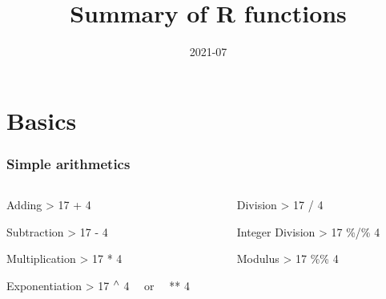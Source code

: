 \documentclass[ucs]{beamer}
\title[]{Summary of R functions}
\date[2021-07]{2021-07}
\DeclareMathOperator\caret{\raisebox{1ex}{$\scriptstyle\wedge$}}
\begin{document}
  
  \begin{frame}
    \titlepage
  \end{frame}
  
  \section{Basics}
  
  \begin{frame}
    \frametitle{Simple arithmetics}
       \begin{columns}[T]
      \begin{column}{0.5\textwidth}
          \begin{block}{Adding}
        \ttfamily > 17 + 4 
           \end{block}
     \begin{block}{Subtraction}
        \ttfamily > 17 - 4 
      \end{block}
      \begin{block}{Multiplication}
         \ttfamily > 17 * 4 
       \end{block}
           \begin{block}{Exponentiation}
       \ttfamily > 17 $\caret$ 4  \rmfamily ~~or~~  ** 4
     \end{block}
   
      \end{column}    
      \begin{column}{0.5\textwidth}
        
      \begin{block}{Division}
        \ttfamily > 17 / 4 
      \end{block}
      
      
      \begin{block}{Integer Division}
  \ttfamily > 17 \%/\% 4 
\end{block}
  \begin{block}{Modulus}
    \ttfamily > 17 \%\% 4 
  \end{block}

      \end{column}
    \end{columns}
  \end{frame}
  
\end{document}
